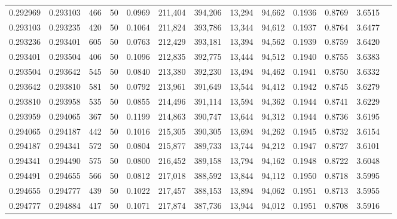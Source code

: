 \begin{tabular}{rrrrrrrrrrrrr}
0.292969 & 0.293103 &   466 &  50 &                                     0.0969 & 211,404 & 394,206 &  13,294 &  94,662 & 0.1936 & 0.8769 & 3.6515 \\
0.293103 & 0.293235 &   420 &  50 &                                     0.1064 & 211,824 & 393,786 &  13,344 &  94,612 & 0.1937 & 0.8764 & 3.6477 \\
0.293236 & 0.293401 &   605 &  50 &                                     0.0763 & 212,429 & 393,181 &  13,394 &  94,562 & 0.1939 & 0.8759 & 3.6420 \\
0.293401 & 0.293504 &   406 &  50 &                                     0.1096 & 212,835 & 392,775 &  13,444 &  94,512 & 0.1940 & 0.8755 & 3.6383 \\
0.293504 & 0.293642 &   545 &  50 &                                     0.0840 & 213,380 & 392,230 &  13,494 &  94,462 & 0.1941 & 0.8750 & 3.6332 \\
0.293642 & 0.293810 &   581 &  50 &                                     0.0792 & 213,961 & 391,649 &  13,544 &  94,412 & 0.1942 & 0.8745 & 3.6279 \\
0.293810 & 0.293958 &   535 &  50 &                                     0.0855 & 214,496 & 391,114 &  13,594 &  94,362 & 0.1944 & 0.8741 & 3.6229 \\
0.293959 & 0.294065 &   367 &  50 &                                     0.1199 & 214,863 & 390,747 &  13,644 &  94,312 & 0.1944 & 0.8736 & 3.6195 \\
0.294065 & 0.294187 &   442 &  50 &                                     0.1016 & 215,305 & 390,305 &  13,694 &  94,262 & 0.1945 & 0.8732 & 3.6154 \\
0.294187 & 0.294341 &   572 &  50 &                                     0.0804 & 215,877 & 389,733 &  13,744 &  94,212 & 0.1947 & 0.8727 & 3.6101 \\
0.294341 & 0.294490 &   575 &  50 &                                     0.0800 & 216,452 & 389,158 &  13,794 &  94,162 & 0.1948 & 0.8722 & 3.6048 \\
0.294491 & 0.294655 &   566 &  50 &                                     0.0812 & 217,018 & 388,592 &  13,844 &  94,112 & 0.1950 & 0.8718 & 3.5995 \\
0.294655 & 0.294777 &   439 &  50 &                                     0.1022 & 217,457 & 388,153 &  13,894 &  94,062 & 0.1951 & 0.8713 & 3.5955 \\
0.294777 & 0.294884 &   417 &  50 &                                     0.1071 & 217,874 & 387,736 &  13,944 &  94,012 & 0.1951 & 0.8708 & 3.5916 \\

\end{tabular}
